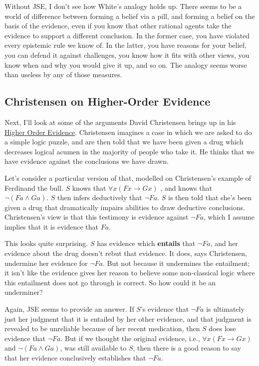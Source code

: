 Without JSE, I don't see how White's analogy holds up. There seems to be a world of difference between forming a belief via a pill, and forming a belief on the basis of the evidence, even if you know that other rational agents take the evidence to support a different conclusion. In the former case, you have violated every epistemic rule we know of. In the latter, you have reasons for your belief, you can defend it against challenges, you know how it fits with other views, you know when and why you would give it up, and so on. The analogy seems worse than useless by any of those measures.

\subsection{Christensen on Higher-Order Evidence}

Next, I'll look at some of the arguments David Christensen brings up in his \href{http://www.brown.edu/Departments/Philosophy/faculty/christensen/Higher-OrderEvidence.pdf}{Higher Order Evidence}. Christensen imagines a case in which we are asked to do a simple logic puzzle, and are then told that we have been given a drug which decreases logical acumen in the majority of people who take it. He thinks that we have evidence against the conclusions we have drawn.

Let's consider a particular version of that, modelled on Christensen's example of Ferdinand the bull. \(S\) knows that \(\forall x (Fx \rightarrow Gx)\) , and knows that \(\neg (Fa \wedge Ga)\). \(S\) then infers deductively that \(\neg Fa\). \(S\) is then told that she's been given a drug that dramatically impairs abilities to draw deductive conclusions. Christensen's view is that this testimony is evidence against  \(\neg Fa\), which I assume implies that it is evidence that \(Fa\).

This looks quite surprising. \(S\) has evidence which \textbf{entails} that \(\neg Fa\), and her evidence about the drug doesn't rebut that evidence. It does, says Christensen, undermine her evidence for \(\neg Fa\). But not because it undermines the entailment; it isn't like the evidence gives her reason to believe some non-classical logic where this entailment does not go through is correct. So how could it be an underminer?

Again, JSE seems to provide an answer. If \(S\)'s evidence that \(\neg Fa\) is ultimately just her judgment that it is entailed by her other evidence, and that judgment is revealed to be unreliable because of her recent medication, then \(S\) does lose evidence that \(\neg Fa\). But if we thought the original evidence, i.e., \(\forall x (Fx \rightarrow Gx)\) and \(\neg (Fa \wedge Ga)\), was still available to \(S\), then there is a good reason to say that her evidence conclusively establishes that \(\neg Fa\).

